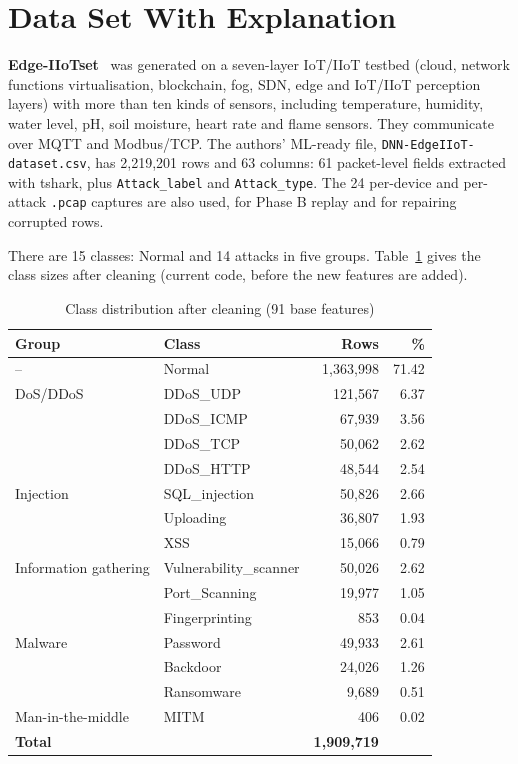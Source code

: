 \section{Data Set With Explanation}
\textbf{Edge-IIoTset}~\cite{ferrag2022edge} was generated on a seven-layer IoT/IIoT testbed (cloud, network functions virtualisation, blockchain, fog, SDN, edge and IoT/IIoT perception layers) with more than ten kinds of sensors, including temperature, humidity, water level, pH, soil moisture, heart rate and flame sensors. They communicate over MQTT and Modbus/TCP. The authors' ML-ready file, \texttt{DNN-EdgeIIoT-dataset.csv}, has 2{,}219{,}201 rows and 63 columns: 61 packet-level fields extracted with tshark, plus \texttt{Attack\_label} and \texttt{Attack\_type}. The 24 per-device and per-attack \texttt{.pcap} captures are also used, for Phase B replay and for repairing corrupted rows.

There are 15 classes: Normal and 14 attacks in five groups. Table~\ref{tab:classes} gives the class sizes after cleaning (current code, before the new features are added).

\begin{table}[H]
\centering
\renewcommand{\arraystretch}{1.15}
\begin{tabular}{|l|l|r|r|}
\hline
\textbf{Group} & \textbf{Class} & \textbf{Rows} & \textbf{\%} \\ \hline
-- & Normal & 1{,}363{,}998 & 71.42 \\ \hline
DoS/DDoS & DDoS\_UDP & 121{,}567 & 6.37 \\
 & DDoS\_ICMP & 67{,}939 & 3.56 \\
 & DDoS\_TCP & 50{,}062 & 2.62 \\
 & DDoS\_HTTP & 48{,}544 & 2.54 \\ \hline
Injection & SQL\_injection & 50{,}826 & 2.66 \\
 & Uploading & 36{,}807 & 1.93 \\
 & XSS & 15{,}066 & 0.79 \\ \hline
Information gathering & Vulnerability\_scanner & 50{,}026 & 2.62 \\
 & Port\_Scanning & 19{,}977 & 1.05 \\
 & Fingerprinting & 853 & 0.04 \\ \hline
Malware & Password & 49{,}933 & 2.61 \\
 & Backdoor & 24{,}026 & 1.26 \\
 & Ransomware & 9{,}689 & 0.51 \\ \hline
Man-in-the-middle & MITM & 406 & 0.02 \\ \hline
\multicolumn{2}{|l|}{\textbf{Total}} & \textbf{1{,}909{,}719} & \\ \hline
\end{tabular}
\caption{Class distribution after cleaning (91 base features)}
\label{tab:classes}
\end{table}

